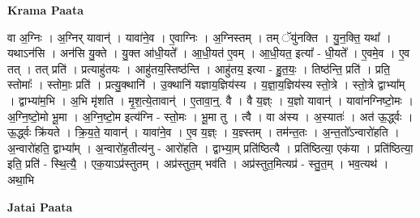 \documentclass[17pt]{extarticle}
\begin{document}
\textbf{Krama Paata} \newline

वा अ॒ग्निः । अ॒ग्निर् यावान्॑ । यावा॑ने॒व । ए॒वाग्निः । अ॒ग्निस्तम् । तम् ॅयु॑नक्ति । यु॒न॒क्ति॒ यथा᳚ । यथाऽन॑सि । अन॑सि यु॒क्ते । यु॒क्त आ॑धी॒यते᳚ । आ॒धी॒यत॑ ए॒वम् । आ॒धी॒यत॒ इत्या᳚ - धी॒यते᳚ । ए॒वमे॒व । ए॒व तत् । तत् प्रति॑ । प्रत्याहु॑तयः । आहु॑तय॒स्तिष्ठ॑न्ति । आहु॑तय॒ इत्या - हु॒त॒यः॒ । तिष्ठ॑न्ति॒ प्रति॑ । प्रति॒ स्तोमाः᳚ । स्तोमाः॒ प्रति॑ । प्रत्यु॒क्थानि॑ । उ॒क्थानि॑ यज्ञाय॒ज्ञिय॑स्य । य॒ज्ञा॒य॒ज्ञिय॑स्य स्तो॒त्रे । स्तो॒त्रे द्वाभ्या᳚म् । द्वाभ्या॑म॒भि । अ॒भि मृ॑शति । मृ॒श॒त्ये॒तावान्॑ । ए॒तावा॒न्॒. वै । वै य॒ज्ञ्ः । य॒ज्ञो यावान्॑ । यावा॑नग्निष्टो॒मः । अ॒ग्नि॒ष्टो॒मो भू॒मा । अ॒ग्नि॒ष्टो॒म इत्य॑ग्नि - स्तो॒मः । भू॒मा तु । त्वै । वा अ॑स्य । अ॒स्यातः॑ । अत॑ ऊ॒र्द्ध्वः । ऊ॒र्द्ध्वः क्रि॑यते । क्रि॒य॒ते॒ यावान्॑ । यावा॑ने॒व । ए॒व य॒ज्ञ्ः । य॒ज्ञ्स्तम् । तम॑न्त॒तः । अ॒न्त॒तो᳚ऽन्वारो॑हति । अ॒न्वारो॑हति॒ द्वाभ्या᳚म् । अ॒न्वारो॑ह॒तीत्य॑नु - आरो॑हति । द्वाभ्या॒म् प्रति॑ष्ठित्यै । प्रति॑ष्ठित्या॒ एक॑या । प्रति॑ष्ठित्या॒ इति॒ प्रति॑ - स्थि॒त्यै॒ । एक॒याऽप्र॑स्तुतम् । अप्र॑स्तुत॒म् भव॑ति । अप्र॑स्तुत॒मित्यप्र॑ - स्तु॒त॒म् । भव॒त्यथ॑ । अथा॒भि \newline

\textbf{Jatai Paata} \newline
\end{document}
